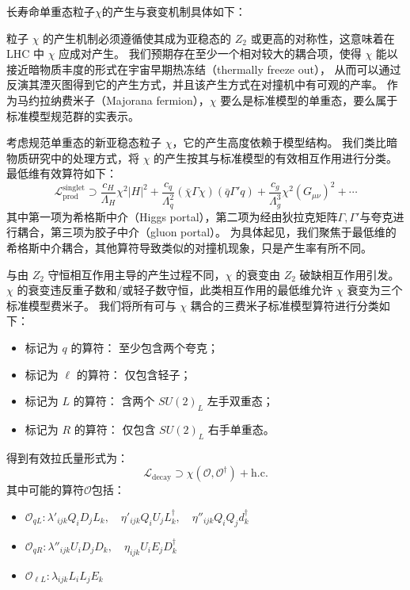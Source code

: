 长寿命单重态粒子$\chi$的产生与衰变机制具体如下：
\cite{Cui_2015}

粒子 $\chi$ 的产生机制必须遵循使其成为亚稳态的 $Z_2$ 或更高的对称性，这意味着在 LHC 中 $\chi$ 应成对产生。
我们预期存在至少一个相对较大的耦合项，使得 $\chi$ 能以接近暗物质丰度的形式在宇宙早期热冻结（thermally freeze out），
从而可以通过反演其湮灭图得到它的产生方式，并且该产生方式在对撞机中有可观的产率。
作为马约拉纳费米子（Majorana fermion），$\chi$ 要么是标准模型的单重态，要么属于标准模型规范群的实表示。

考虑规范单重态的新亚稳态粒子 $\chi$，它的产生高度依赖于模型结构。
我们类比暗物质研究中的处理方式，将 $\chi$ 的产生按其与标准模型的有效相互作用进行分类。最低维有效算符如下：
\begin{equation}
    \mathcal{L}_{\text{prod}}^{\text{singlet}} \supset \frac{c_H}{\Lambda_H} \chi^2 |H|^2 +
    \frac{c_q}{\Lambda_q^2} (\bar{\chi} \Gamma \chi)(\bar{q} \Gamma' q) +
    \frac{c_g}{\Lambda_g^3} \chi^2 (G_{\mu\nu})^2 + \cdots
\end{equation}
其中第一项为希格斯中介（Higgs portal），第二项为经由狄拉克矩阵$\Gamma, \Gamma'$与夸克进行耦合，第三项为胶子中介（gluon portal）。
为具体起见，我们聚焦于最低维的希格斯中介耦合，其他算符导致类似的对撞机现象，只是产生率有所不同。

与由 $Z_2$ 守恒相互作用主导的产生过程不同，$\chi$ 的衰变由 $Z_2$ 破缺相互作用引发。
$\chi$ 的衰变违反重子数和/或轻子数守恒，此类相互作用的最低维允许 $\chi$ 衰变为三个标准模型费米子。
我们将所有可与 $\chi$ 耦合的三费米子标准模型算符进行分类如下：
\begin{itemize}
    \item {标记为 $q$ 的算符：} 至少包含两个夸克；
    \item {标记为 $\ell$ 的算符：} 仅包含轻子；
    \item {标记为 $L$ 的算符：} 含两个 $SU(2)_L$ 左手双重态；
    \item {标记为 $R$ 的算符：} 仅包含 $SU(2)_L$ 右手单重态。
\end{itemize}
得到有效拉氏量形式为：
\begin{equation}
    \mathcal{L}_{\text{decay}} \supset \chi (\mathcal{O}, \mathcal{O}^\dagger) + \text{h.c.}
\end{equation}
其中可能的算符$\mathcal{O}$包括：
\begin{itemize}
    \item $\mathcal{O}_{qL}     : \lambda'_{ijk} Q_i D_j L_k,\quad \eta'_{ijk} Q_i U_j L^\dagger_k,\quad \eta''_{ijk} Q_i Q_j d^\dagger_k$
    \item $\mathcal{O}_{qR}     : \lambda''_{ijk} U_i D_j D_k,\quad \eta_{ijk} U_i E_j D^\dagger_k$
    \item $\mathcal{O}_{\ell L} : \lambda_{ijk} L_i L_j E_k$
\end{itemize}

